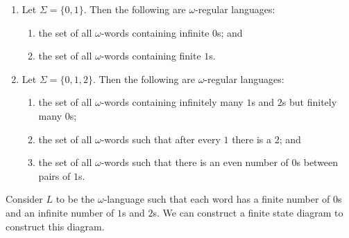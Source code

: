 \begin{example}
    \hfill
    \begin{enumerate}
        \item Let $\Sigma = \{0,1\}$.
            Then the following are $\omega$-regular languages:
            \begin{enumerate}
                \item the set of all $\omega$-words
                    containing infinite $0$s; and
                \item the set of all $\omega$-words
                    containing finite $1$s.
            \end{enumerate}
        \item Let $\Sigma = \{0,1,2\}$.
            Then the following are $\omega$-regular languages:
            \begin{enumerate}
                \item the set of all $\omega$-words
                    containing infinitely many $1$s and $2$s
                    but finitely many $0$s;
                \item the set of all $\omega$-words
                    such that after every $1$ there is a $2$; and
                \item the set of all $\omega$-words
                    such that there is an even number of $0$s between pairs
                    of $1$s.
            \end{enumerate}
    \end{enumerate}
\end{example}

\begin{example}
    Consider $L$ to be the $\omega$-language 
    such that each word has a finite number
    of $0$s and an infinite number of $1$s and $2$s.
    We can construct a finite state diagram to construct this diagram.
    \begin{center}
    \end{center}
\end{example}

